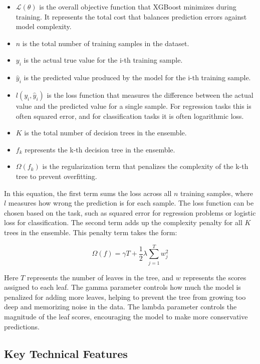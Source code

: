\documentclass[12pt, a4paper]{report}
\numberwithin{equation}{chapter}
\begin{document}
\begin{itemize}
\item $\mathcal{L}(\theta)$ is the overall objective function that XGBoost minimizes during training. It represents the total cost that balances prediction errors against model complexity.
\item $n$ is the total number of training samples in the dataset.
\item $y_i$ is the actual true value for the i-th training sample.
\item $\hat{y}_i$ is the predicted value produced by the model for the i-th training sample.
\item $l(y_i, \hat{y}_i)$ is the loss function that measures the difference between the actual value and the predicted value for a single sample. For regression tasks this is often squared error, and for classification tasks it is often logarithmic loss.
\item $K$ is the total number of decision trees in the ensemble.
\item $f_k$ represents the k-th decision tree in the ensemble.
\item $\Omega(f_k)$ is the regularization term that penalizes the complexity of the k-th tree to prevent overfitting.
\end{itemize}

In this equation, the first term sums the loss across all $n$ training samples, where $l$ measures how wrong the prediction is for each sample. The loss function can be chosen based on the task, such as squared error for regression problems or logistic loss for classification. The second term adds up the complexity penalty for all $K$ trees in the ensemble. This penalty term takes the form:

\begin{equation}
\Omega(f) = \gamma T + \frac{1}{2}\lambda \sum_{j=1}^{T} w_j^2
\label{eq:regularization}
\end{equation}

Here $T$ represents the number of leaves in the tree, and $w$ represents the scores assigned to each leaf. The gamma parameter controls how much the model is penalized for adding more leaves, helping to prevent the tree from growing too deep and memorizing noise in the data. The lambda parameter controls the magnitude of the leaf scores, encouraging the model to make more conservative predictions.

\subsection{Key Technical Features}
\end{document}
